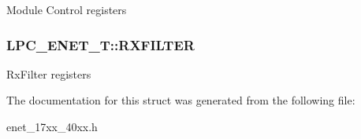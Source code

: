 Module Control registers \hypertarget{struct_l_p_c___e_n_e_t___t_a4076c6a080ba8b6e6e7af7343408080b}{
\subsubsection[{R\+X\+F\+I\+L\+T\+E\+R}]{ L\+P\+C\+\_\+\+E\+N\+E\+T\+\_\+\+T\+::\+R\+X\+F\+I\+L\+T\+E\+R}}\label{struct_l_p_c___e_n_e_t___t_a4076c6a080ba8b6e6e7af7343408080b}
Rx\+Filter registers 

The documentation for this struct was generated from the following file\+:\begin{DoxyCompactItemize}
\item 
enet\+\_\+17xx\+\_\+40xx.\+h\end{DoxyCompactItemize}

